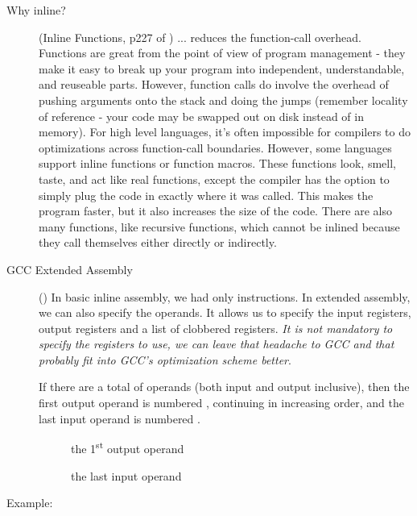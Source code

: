 \begin{description}
\item[Why inline?] (Inline Functions, p227 of \cite{bartlett2009programming}) ... reduces
  the function-call overhead. Functions are great from the point of view of program
  management - they make it easy to break up your program into independent,
  understandable, and reuseable parts.  However, function calls do involve the overhead of
  pushing arguments onto the stack and doing the jumps (remember locality of reference -
  your code may be swapped out on disk instead of in memory).  For high level languages,
  it's often impossible for compilers to do optimizations across function-call boundaries.
  However, some languages support inline functions or function macros.  These functions
  look, smell, taste, and act like real functions, except the compiler has the option to
  simply plug the code in exactly where it was called. This makes the program faster, but
  it also increases the size of the code. There are also many functions, like recursive
  functions, which cannot be inlined because they call themselves either directly or
  indirectly.
\item[GCC Extended Assembly] (\cite{gcc-inline-asm}) In basic inline assembly, we had only
  instructions. In extended assembly, we can also specify the operands. It allows us to
  specify the input registers, output registers and a list of clobbered
  registers. \emph{It is not mandatory to specify the registers to use, we can leave that
    headache to GCC and that probably fit into GCC’s optimization scheme better}.

  If there are a total of  operands (both input and output inclusive), then the
  first output operand is numbered , continuing in increasing order, and the last input
  operand is numbered .
  \begin{description}
  \item[] the 1\textsuperscript{st} output operand
  \item[] the last input operand
  \end{description}
\end{description}

\begin{frame}
  \begin{block}{Example: }
    \begin{center}
    \end{center}
  \end{block}
\end{frame}

